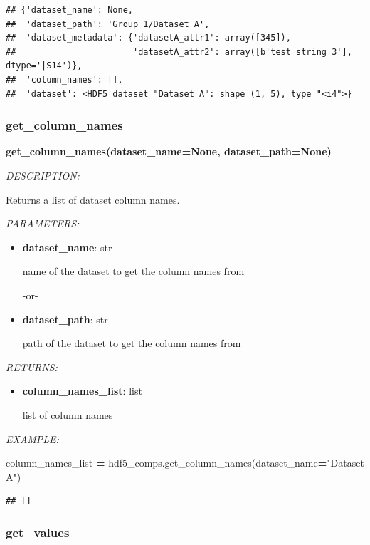 \documentclass[
]{article}
\newenvironment{Shaded}{\begin{snugshade}}{\end{snugshade}}
\newcommand{\NormalTok}[1]{#1}
\newcommand{\OperatorTok}[1]{\textcolor[rgb]{0.81,0.36,0.00}{\textbf{#1}}}
\newcommand{\StringTok}[1]{\textcolor[rgb]{0.31,0.60,0.02}{#1}}
\begin{document}
\begin{verbatim}
## {'dataset_name': None,
##  'dataset_path': 'Group 1/Dataset A',
##  'dataset_metadata': {'datasetA_attr1': array([345]),
##                       'datasetA_attr2': array([b'test string 3'], dtype='|S14')},
##  'column_names': [],
##  'dataset': <HDF5 dataset "Dataset A": shape (1, 5), type "<i4">}
\end{verbatim}

\hypertarget{get_column_names}{%
\subsubsection{get\_column\_names}\label{get_column_names}}

\textbf{get\_column\_names(dataset\_name=None, dataset\_path=None)}

\emph{DESCRIPTION:}

Returns a list of dataset column names.

\emph{PARAMETERS:}

\begin{itemize}
\item
  \textbf{dataset\_name}: str

  name of the dataset to get the column names from

  -or-
\item
  \textbf{dataset\_path}: str

  path of the dataset to get the column names from
\end{itemize}

\emph{RETURNS:}

\begin{itemize}
\item
  \textbf{column\_names\_list}: list

  list of column names
\end{itemize}

\emph{EXAMPLE:}

\begin{Shaded}
\begin{Highlighting}[]
\NormalTok{column_names_list }\OperatorTok{=}\NormalTok{ hdf5_comps.get_column_names(dataset_name}\OperatorTok{=}\StringTok{"Dataset A"}\NormalTok{)}
\end{Highlighting}
\end{Shaded}

\begin{verbatim}
## []
\end{verbatim}

\hypertarget{get_values}{%
\subsubsection{get\_values}\label{get_values}}
\end{document}
